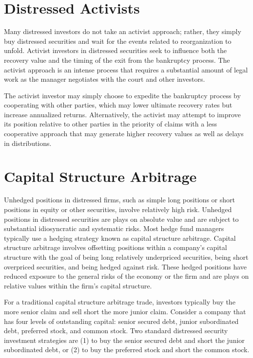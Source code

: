 \documentclass[11pt]{article}
\begin{document}
\section*{Distressed Activists}
Many distressed investors do not take an activist approach; rather, they simply buy distressed securities and wait for the events related to reorganization to unfold. Activist investors in distressed securities seek to influence both the recovery value and the timing of the exit from the bankruptcy process. The activist approach is an intense process that requires a substantial amount of legal work as the manager negotiates with the court and other investors.

The activist investor may simply choose to expedite the bankruptcy process by cooperating with other parties, which may lower ultimate recovery rates but increase annualized returns. Alternatively, the activist may attempt to improve its position relative to other parties in the priority of claims with a less cooperative approach that may generate higher recovery values as well as delays in distributions.

\section*{Capital Structure Arbitrage}
Unhedged positions in distressed firms, such as simple long positions or short positions in equity or other securities, involve relatively high risk. Unhedged positions in distressed securities are plays on absolute value and are subject to substantial idiosyncratic and systematic risks. Most hedge fund managers typically use a hedging strategy known as capital structure arbitrage. Capital structure arbitrage involves offsetting positions within a company's capital structure with the goal of being long relatively underpriced securities, being short overpriced securities, and being hedged against risk. These hedged positions have reduced exposure to the general risks of the economy or the firm and are plays on relative values within the firm's capital structure.

For a traditional capital structure arbitrage trade, investors typically buy the more senior claim and sell short the more junior claim. Consider a company that has four levels of outstanding capital: senior secured debt, junior subordinated debt, preferred stock, and common stock. Two standard distressed security investment strategies are (1) to buy the senior secured debt and short the junior subordinated debt, or (2) to buy the preferred stock and short the common stock.
\end{document}
